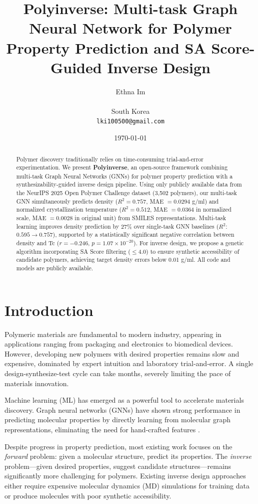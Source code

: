 \documentclass{article}
\title{\textbf{Polyinverse}: Multi-task Graph Neural Network for Polymer Property Prediction 
and SA Score-Guided Inverse Design}
\author{
  Ethna Im \\
     \\
  South Korea \\
  \texttt{lki100500@gmail.com}
}
\date{\today}
\begin{document}
\maketitle

\begin{abstract}
Polymer discovery traditionally relies on time-consuming trial-and-error experimentation.
We present \textbf{Polyinverse}, an open-source framework combining multi-task Graph Neural
Networks (GNNs) for polymer property prediction with a synthesizability-guided inverse design
pipeline. Using only publicly available data from the NeurIPS 2025 Open Polymer Challenge
dataset (3,502 polymers), our multi-task GNN simultaneously predicts density
($R^2 = 0.757$, MAE $= 0.0294$ g/ml) and normalized crystallization temperature
($R^2 = 0.512$, MAE $= 0.0364$ in normalized scale, MAE $= 0.0028$ in original unit) from SMILES representations.
Multi-task learning improves density prediction by 27\% over single-task GNN baselines
($R^2$: $0.595 \rightarrow 0.757$), supported by a statistically significant negative
correlation between density and Tc ($r = -0.246$, $p = 1.07 \times 10^{-20}$).
For inverse design, we propose a genetic algorithm incorporating SA Score filtering
($\leq 4.0$) to ensure synthetic accessibility of candidate polymers, achieving target
density errors below 0.01 g/ml. All code and models are publicly available.
\end{abstract}

\section{Introduction}

Polymeric materials are fundamental to modern industry, appearing in applications
ranging from packaging and electronics to biomedical devices. However, developing
new polymers with desired properties remains slow and expensive, dominated by
expert intuition and laboratory trial-and-error. A single design-synthesize-test
cycle can take months, severely limiting the pace of materials innovation.

Machine learning (ML) has emerged as a powerful tool to accelerate materials discovery.
Graph neural networks (GNNs) have shown strong performance in predicting molecular
properties by directly learning from molecular graph representations,
eliminating the need for hand-crafted features \citep{gcnn_polymer_2018}.

Despite progress in property prediction, most existing work focuses on the
\textit{forward} problem: given a molecular structure, predict its properties.
The \textit{inverse} problem---given desired properties, suggest candidate
structures---remains significantly more challenging for polymers.
Existing inverse design approaches either require expensive molecular dynamics
(MD) simulations for training data \citep{vitrimer_inverse_2023} or produce
molecules with poor synthetic accessibility.
\end{document}
